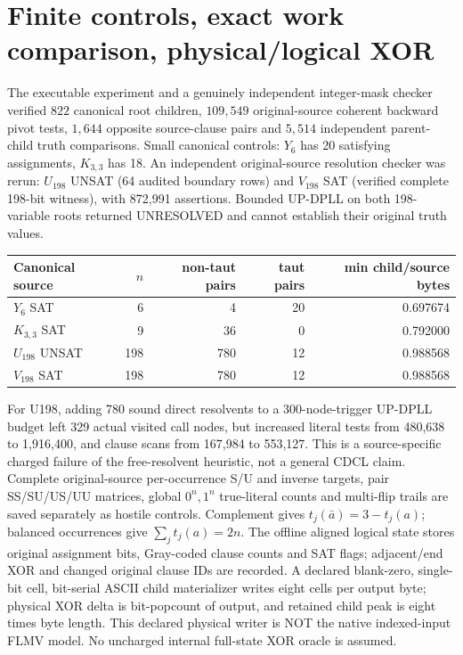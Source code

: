 \documentclass[10pt]{article}
\begin{document}
\section{Finite controls, exact work comparison, physical/logical XOR}
The executable experiment and a genuinely independent integer-mask checker verified $822$ canonical root children, $109{,}549$ original-source coherent backward pivot tests, $1{,}644$ opposite source-clause pairs and $5{,}514$ independent parent-child truth comparisons. Small canonical controls: $Y_6$ has 20 satisfying assignments, $K_{3,3}$ has 18. An independent original-source resolution checker was rerun: $U_{198}$ UNSAT (64 audited boundary rows) and $V_{198}$ SAT (verified complete 198-bit witness), with 872,991 assertions. Bounded UP-DPLL on both 198-variable roots returned UNRESOLVED and cannot establish their original truth values.
\begin{center}\begin{tabular}{lrrrr}\toprule
Canonical source & $n$ & non-taut pairs & taut pairs & min child/source bytes\\\midrule
$Y_6$ SAT &6&4&20&0.697674\\
$K_{3,3}$ SAT &9&36&0&0.792000\\
$U_{198}$ UNSAT &198&780&12&0.988568\\
$V_{198}$ SAT &198&780&12&0.988568\\\bottomrule\end{tabular}\end{center}
For U198, adding 780 sound direct resolvents to a 300-node-trigger UP-DPLL budget left 329 actual visited call nodes, but increased literal tests from 480,638 to 1,916,400, and clause scans from 167,984 to 553,127. This is a source-specific charged failure of the free-resolvent heuristic, not a general CDCL claim. Complete original-source per-occurrence S/U and inverse targets, pair SS/SU/US/UU matrices, global $0^n,1^n$ true-literal counts and multi-flip trails are saved separately as hostile controls. Complement gives $t_j(\bar a)=3-t_j(a)$; balanced occurrences give $\sum_jt_j(a)=2n$. The offline aligned logical state stores original assignment bits, Gray-coded clause counts and SAT flags; adjacent/end XOR and changed original clause IDs are recorded. A declared blank-zero, single-bit cell, bit-serial ASCII child materializer writes eight cells per output byte; physical XOR delta is bit-popcount of output, and retained child peak is eight times byte length. This declared physical writer is NOT the native indexed-input FLMV model. No uncharged internal full-state XOR oracle is assumed.
\end{document}
